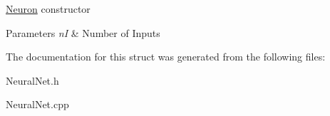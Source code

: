 \hyperlink{struct_neuron}{Neuron} constructor 
\begin{DoxyParams}{Parameters}
{\em nI} & Number of Inputs \\
\hline
\end{DoxyParams}


The documentation for this struct was generated from the following files\+:\begin{DoxyCompactItemize}
\item 
Neural\+Net.\+h\item 
Neural\+Net.\+cpp\end{DoxyCompactItemize}
